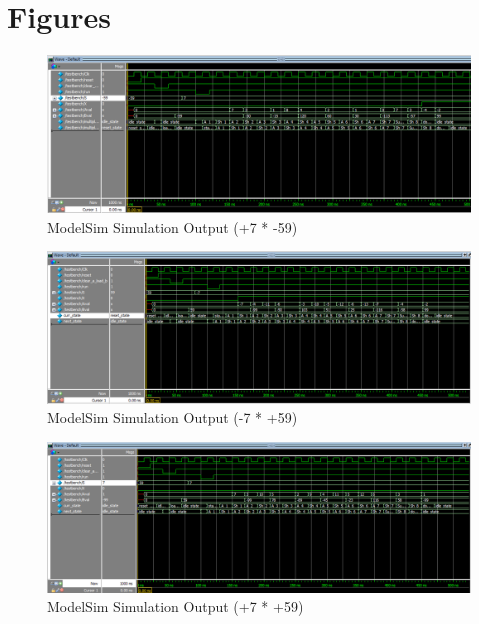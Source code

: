 \documentclass[journal, twocolumn, final,11pt,letterpaper]{IEEEtran}
\begin{document}
\clearpage
\onecolumn
\section{Figures}

\begin{figure} [htbp]
	\centering
	\includegraphics[scale=0.4]{simulation1.png}
	\caption{ModelSim Simulation Output (+7 * -59)\label{fig:simulation1}}
\end{figure}

\begin{figure} [htbp]
	\centering
	\includegraphics[scale=0.4]{simulation2.png}
	\caption{ModelSim Simulation Output (-7 * +59)\label{fig:simulation2t}}
\end{figure}

\begin{figure} [htbp]
	\centering
	\includegraphics[scale=0.4]{simulation3.png}
	\caption{ModelSim Simulation Output (+7 * +59)\label{fig:simulation3}}
\end{figure}
\end{document}
